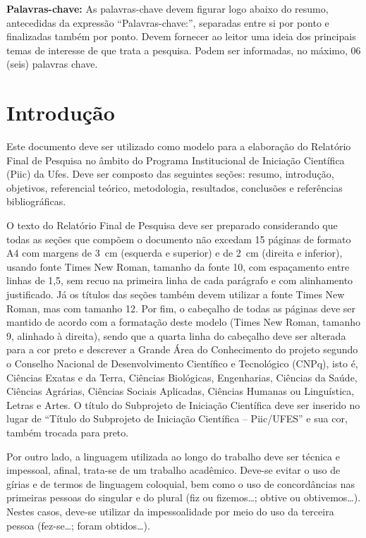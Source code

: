 \documentclass[10pt,a4paper]{article}
\begin{document}
\vspace{\baselineskip}
\textbf{Palavras-chave:} As palavras-chave devem figurar logo abaixo do resumo, antecedidas da expressão ``Palavras-chave:'', separadas entre si por ponto e finalizadas também por ponto. Devem fornecer ao leitor uma ideia dos principais temas de interesse de que trata a pesquisa. Podem ser informadas, no máximo, 06 (seis) palavras chave.

\section{Introdução}
Este documento deve ser utilizado como modelo para a elaboração do Relatório Final de Pesquisa no âmbito do Programa Institucional de Iniciação Científica (Piic) da Ufes. Deve ser composto das seguintes seções: resumo, introdução, objetivos, referencial teórico, metodologia, resultados, conclusões e referências bibliográficas.

\vspace{\baselineskip}
O texto do Relatório Final de Pesquisa deve ser preparado considerando que todas as seções que compõem o documento não excedam 15 páginas de formato A4 com margens de 3~cm (esquerda e superior) e de 2~cm (direita e inferior), usando fonte Times New Roman, tamanho da fonte 10, com espaçamento entre linhas de 1,5, sem recuo na primeira linha de cada parágrafo e com alinhamento justificado. Já os títulos das seções também devem utilizar a fonte Times New Roman, mas com tamanho 12. Por fim, o cabeçalho de todas as páginas deve ser mantido de acordo com a formatação deste modelo (Times New Roman, tamanho 9, alinhado à direita), sendo que a quarta linha do cabeçalho deve ser alterada para a cor preto e descrever a Grande Área do Conhecimento do projeto segundo o Conselho Nacional de Desenvolvimento Científico e Tecnológico (CNPq), isto é, Ciências Exatas e da Terra, Ciências Biológicas, Engenharias, Ciências da Saúde, Ciências Agrárias, Ciências Sociais Aplicadas, Ciências Humanas ou Linguística, Letras e Artes. O título do Subprojeto de Iniciação Científica deve ser inserido no lugar de ``Título do Subprojeto de Iniciação Científica -- Piic/UFES'' e sua cor, também trocada para preto.

\vspace{\baselineskip}
Por outro lado, a linguagem utilizada ao longo do trabalho deve ser técnica e impessoal, afinal, trata-se de um trabalho acadêmico. Deve-se evitar o uso de gírias e de termos de linguagem coloquial, bem como o uso de concordâncias nas primeiras pessoas do singular e do plural (fiz ou fizemos\ldots; obtive ou obtivemos\ldots). Nestes casos, deve-se utilizar da impessoalidade por meio do uso da terceira pessoa (fez-se\ldots; foram obtidos\ldots).
\end{document}
